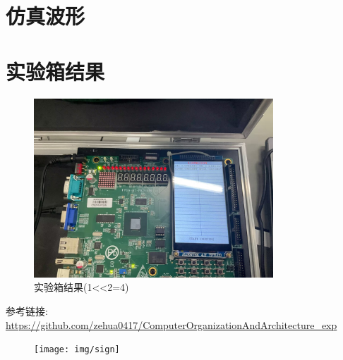 \documentclass[AutoFakeBold]{LZUThesis}
\begin{document}
\section{仿真波形}
\begin{figure}[htbp]
    \centering
    \hfill
    \hfill
\end{figure}

\section{实验箱结果}
\begin{figure}[htbp]
    \centering
    \includegraphics[width=0.8\textwidth]{img/result}
    \caption{实验箱结果(1<<2=4)}
\end{figure}


\backmatter





\Appendix
参考链接:
\url{https://github.com/zehua0417/ComputerOrganizationAndArchitecture_exp}
\begin{figure}[htbp]
    \centering
    \texttt{[image: img/sign]}
\end{figure}



\end{document}
